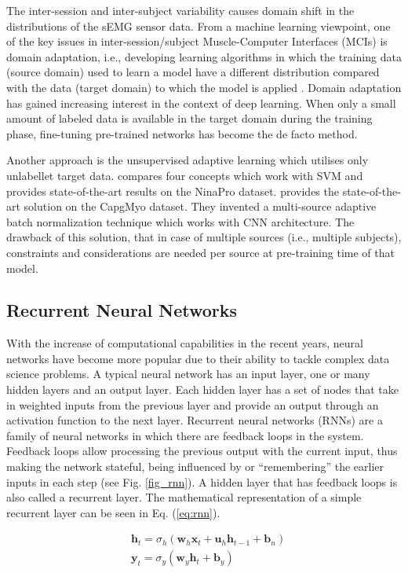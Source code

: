 \documentclass[conference]{IEEEtran}
\begin{document}
The inter-session and inter-subject variability causes domain shift in the distributions of the sEMG sensor data.
From a machine learning viewpoint, one of the key issues in inter-session/subject Muscle-Computer Interfaces (MCIs) is domain adaptation,
i.e., developing learning algorithms in which the training data (source domain) used to learn a model have a different distribution compared with
the data (target domain) to which the model is applied \cite{b18}.
Domain adaptation has gained increasing interest in the context of deep learning.
When only a small amount of labeled data is available in the target domain during the training phase,
fine-tuning pre-trained networks has become the de facto method.

Another approach is the unsupervised adaptive learning which utilises only unlabellet target data.
\cite{b20} compares four concepts which work with SVM and provides state-of-the-art results on the NinaPro dataset.
\cite{b18} provides the state-of-the-art solution on the CapgMyo dataset. They invented a multi-source adaptive batch normalization technique which works with CNN architecture.
The drawback of this solution, that in case of multiple sources (i.e., multiple subjects), constraints and considerations are needed per source at pre-training time of that model.

\subsection{Recurrent Neural Networks}

With the increase of computational capabilities in the recent years, neural networks have become more popular due to their ability to tackle complex data science problems. A typical neural network has an input layer, one or many hidden layers and an output layer. Each hidden layer has a set of nodes that take in weighted inputs from the previous layer and provide an output through an activation function to the next layer. Recurrent neural networks (RNNs) are a family of neural networks in which there are feedback loops in the system. Feedback loops allow processing the previous output with the current input, thus making the network stateful, being influenced by or “remembering” the earlier inputs in each step (see Fig. \ref{fig_rnn}). A hidden layer that has feedback loops is also called a recurrent layer. The mathematical representation of a simple recurrent layer can be seen in Eq. (\ref{eq:rnn}).

\begin{equation} \label{eq:rnn}
\begin{aligned}
& \mathbf{h}_{t} = \sigma_{h} (\mathbf{w}_{h}\mathbf{x}_{t}+\mathbf{u}_{h}\mathbf{h}_{t-1}+\mathbf{b}_{n}) \\
& \mathbf{y}_{t} = \sigma_{y} (\mathbf{w}_{y}\mathbf{h}_{t}+\mathbf{b}_{y})
\end{aligned}
\end{equation}
\end{document}

